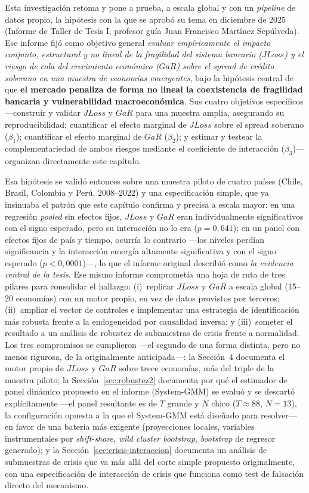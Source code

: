 Esta investigación retoma y pone a prueba, a escala global y con un \textit{pipeline} de datos propio, la hipótesis con la que se aprobó su tema en diciembre de 2025 (Informe de Taller de Tesis I, profesor guía Juan Francisco Martínez Sepúlveda). Ese informe fijó como objetivo general \textit{evaluar empíricamente el impacto conjunto, estructural y no lineal de la fragilidad del sistema bancario ($JLoss$) y el riesgo de cola del crecimiento económico ($GaR$) sobre el spread de crédito soberano en una muestra de economías emergentes}, bajo la hipótesis central de que \textbf{el mercado penaliza de forma no lineal la coexistencia de fragilidad bancaria y vulnerabilidad macroeconómica}. Sus cuatro objetivos específicos —construir y validar $JLoss$ y $GaR$ para una muestra amplia, asegurando su reproducibilidad; cuantificar el efecto marginal de $JLoss$ sobre el spread soberano ($\beta_1$); cuantificar el efecto marginal de $GaR$ ($\beta_2$); y estimar y testear la complementariedad de ambos riesgos mediante el coeficiente de interacción ($\beta_3$)— organizan directamente este capítulo.

Esa hipótesis se validó entonces sobre una muestra piloto de cuatro países (Chile, Brasil, Colombia y Perú, 2008--2022) y una especificación simple, que ya insinuaba el patrón que este capítulo confirma y precisa a escala mayor: en una regresión \textit{pooled} sin efectos fijos, $JLoss$ y $GaR$ eran individualmente significativos con el signo esperado, pero su interacción no lo era ($p=0{,}641$); en un panel con efectos fijos de país y tiempo, ocurría lo contrario —los niveles perdían significancia y la interacción emergía altamente significativa y con el signo esperado ($p<0{,}0001$)—, lo que el informe original describió como \emph{la evidencia central de la tesis}. Ese mismo informe comprometía una hoja de ruta de tres pilares para consolidar el hallazgo: (i)~replicar $JLoss$ y $GaR$ a escala global (15--20 economías) con un motor propio, en vez de datos provistos por terceros; (ii)~ampliar el vector de controles e implementar una estrategia de identificación más robusta frente a la endogeneidad por causalidad inversa; y (iii)~someter el resultado a un análisis de robustez de submuestras de crisis frente a normalidad. Los tres compromisos se cumplieron —el segundo de una forma distinta, pero no menos rigurosa, de la originalmente anticipada—: la Sección~4 documenta el motor propio de $JLoss$ y $GaR$ sobre trece economías, más del triple de la muestra piloto; la Sección~\ref{sec:robustez2} documenta por qué el estimador de panel dinámico propuesto en el informe (System-GMM) se evaluó y se descartó explícitamente —el panel resultante es de $T$ grande y $N$ chico ($T\approx88$, $N=13$), la configuración opuesta a la que el System-GMM está diseñado para resolver— en favor de una batería más exigente (proyecciones locales, variables instrumentales por \textit{shift-share}, \textit{wild cluster bootstrap}, \textit{bootstrap} de regresor generado); y la Sección~\ref{sec:crisis-interaccion} documenta un análisis de submuestras de crisis que va más allá del corte simple propuesto originalmente, con una especificación de interacción de crisis que funciona como test de falsación directo del mecanismo.

